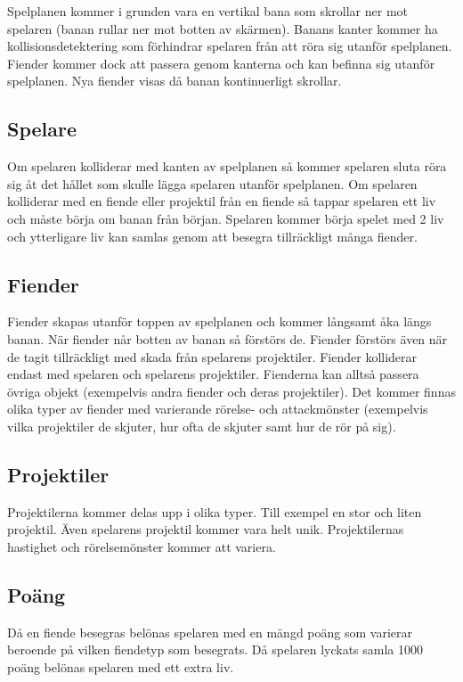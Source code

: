 \documentclass{TDP005mall}
\begin{document}
Spelplanen kommer i grunden vara en vertikal bana som skrollar ner mot spelaren (banan rullar ner mot botten av skärmen).
Banans kanter kommer ha kollisionsdetektering som förhindrar spelaren från att röra sig utanför spelplanen.
Fiender kommer dock att passera genom kanterna och kan befinna sig utanför spelplanen. Nya fiender visas då banan kontinuerligt skrollar.

\subsection{Spelare}
Om spelaren kolliderar med kanten av spelplanen så kommer spelaren sluta röra sig åt det hållet som skulle lägga spelaren utanför spelplanen. 
Om spelaren kolliderar med en fiende eller projektil från en fiende så tappar spelaren ett liv och måste börja om banan från början.
Spelaren kommer börja spelet med 2 liv och ytterligare liv kan samlas genom att besegra tillräckligt många fiender.

\subsection{Fiender}
Fiender skapas utanför toppen av spelplanen och kommer långsamt åka längs banan. 
När fiender når botten av banan så förstörs de. Fiender förstörs även när de tagit tillräckligt med skada från spelarens projektiler.
Fiender kolliderar endast med spelaren och spelarens projektiler. Fienderna kan alltså passera övriga objekt (exempelvis andra fiender och deras projektiler).
Det kommer finnas olika typer av fiender med varierande rörelse- och attackmönster (exempelvis vilka projektiler de skjuter, hur ofta de skjuter samt hur de rör på sig).

\subsection{Projektiler}
Projektilerna kommer delas upp i olika typer. Till exempel en stor och liten projektil. Även spelarens projektil kommer vara helt unik.
Projektilernas hastighet och rörelsemönster kommer att variera.

\subsection{Poäng}
Då en fiende besegras belönas spelaren med en mängd poäng som varierar beroende på vilken fiendetyp som besegrats.
Då spelaren lyckats samla 1000 poäng belönas spelaren med ett extra liv.
\end{document}
